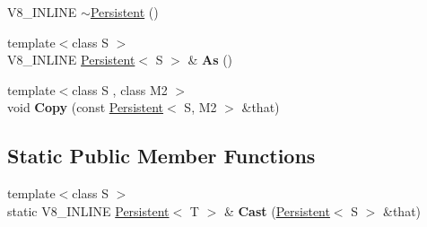 \begin{DoxyCompactItemize}
\item 
V8\+\_\+\+I\+N\+L\+I\+N\+E \hyperlink{classv8_1_1_persistent_a7d4d2bebfe3919e447e22adc15464e25}{$\sim$\+Persistent} ()
\item 
\hypertarget{classv8_1_1_persistent_a8d2c96e559ac88f6201d98cb2a626808}{}{\footnotesize template$<$class S $>$ }\\V8\+\_\+\+I\+N\+L\+I\+N\+E \hyperlink{classv8_1_1_persistent}{Persistent}$<$ S $>$ \& {\bfseries As} ()\label{classv8_1_1_persistent_a8d2c96e559ac88f6201d98cb2a626808}

\item 
\hypertarget{classv8_1_1_persistent_ace50a178e3b772f75611e22e41fae974}{}{\footnotesize template$<$class S , class M2 $>$ }\\void {\bfseries Copy} (const \hyperlink{classv8_1_1_persistent}{Persistent}$<$ S, M2 $>$ \&that)\label{classv8_1_1_persistent_ace50a178e3b772f75611e22e41fae974}

\end{DoxyCompactItemize}
\subsection*{Static Public Member Functions}
\begin{DoxyCompactItemize}
\item 
\hypertarget{classv8_1_1_persistent_aa20fd9af0b410df9e887689ef97c28dd}{}{\footnotesize template$<$class S $>$ }\\static V8\+\_\+\+I\+N\+L\+I\+N\+E \hyperlink{classv8_1_1_persistent}{Persistent}$<$ T $>$ \& {\bfseries Cast} (\hyperlink{classv8_1_1_persistent}{Persistent}$<$ S $>$ \&that)\label{classv8_1_1_persistent_aa20fd9af0b410df9e887689ef97c28dd}

\end{DoxyCompactItemize}

